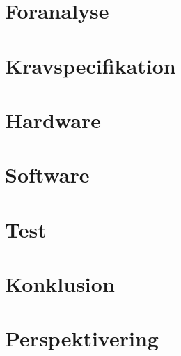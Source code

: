 



\renewcommand\chaptername{Kapitel}
\renewcommand\contentsname{Indholdsfortegnelse}
\renewcommand\figurename{Figur}
\renewcommand\tablename{Tabel} 


\cleardoublepage

\frontmatter




\cleardoublepage

\tableofcontents*
\newpage
\printnomenclature
\renewcommand*\listfigurename{Figurliste}
\renewcommand*\listtablename{Tabelliste}

\mainmatter
\chapter{Foranalyse}



\chapter{Kravspecifikation}


\chapter{Hardware}


\chapter{Software}


\chapter{Test}


\chapter{Konklusion}


\chapter{Perspektivering}

\newpage
\listoffigures
{}
\newpage
\listoftables
{}
\newpage
\printbibliography
\listoffixmes
